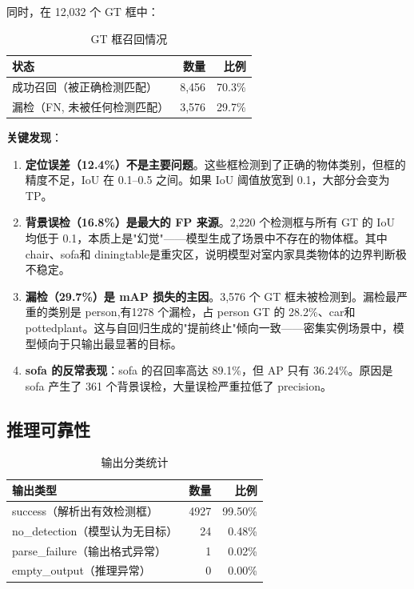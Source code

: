 \documentclass[12pt, a4paper]{article}
\begin{document}
同时，在 12,032 个 GT 框中：

\begin{table}[H]
\centering
\caption{GT 框召回情况}
\label{tab:gt_recall}
\begin{tabular}{@{}lrr@{}}
\toprule
\textbf{状态} & \textbf{数量} & \textbf{比例} \\
\midrule
成功召回（被正确检测匹配） & 8,456 & 70.3\% \\
漏检（FN, 未被任何检测匹配） & 3,576 & 29.7\% \\
\bottomrule
\end{tabular}
\end{table}

\textbf{关键发现}：

\begin{enumerate}
    \item \textbf{定位误差（12.4\%）不是主要问题}。这些框检测到了正确的物体类别，但框的精度不足，IoU 在 0.1--0.5 之间。如果 IoU 阈值放宽到 0.1，大部分会变为 TP。
    \item \textbf{背景误检（16.8\%）是最大的 FP 来源}。2,220 个检测框与所有 GT 的 IoU 均低于 0.1，本质上是"幻觉"——模型生成了场景中不存在的物体框。其中 chair、sofa和 diningtable是重灾区，说明模型对室内家具类物体的边界判断极不稳定。
    \item \textbf{漏检（29.7\%）是 mAP 损失的主因}。3,576 个 GT 框未被检测到。漏检最严重的类别是 person,有1278 个漏检，占 person GT 的 28.2\%、car和 pottedplant。这与自回归生成的"提前终止"倾向一致——密集实例场景中，模型倾向于只输出最显著的目标。
    \item \textbf{sofa 的反常表现}：sofa 的召回率高达 89.1\%，但 AP 只有 36.24\%。原因是 sofa 产生了 361 个背景误检，大量误检严重拉低了 precision。
\end{enumerate}

\subsection{推理可靠性}

\begin{table}[H]
\centering
\caption{输出分类统计}
\label{tab:output_status}
\begin{tabular}{@{}lrr@{}}
\toprule
\textbf{输出类型} & \textbf{数量} & \textbf{比例} \\
\midrule
success（解析出有效检测框） & 4927 & 99.50\% \\
no\_detection（模型认为无目标） & 24 & 0.48\% \\
parse\_failure（输出格式异常） & 1 & 0.02\% \\
empty\_output（推理异常） & 0 & 0.00\% \\
\bottomrule
\end{tabular}
\end{table}
\end{document}
